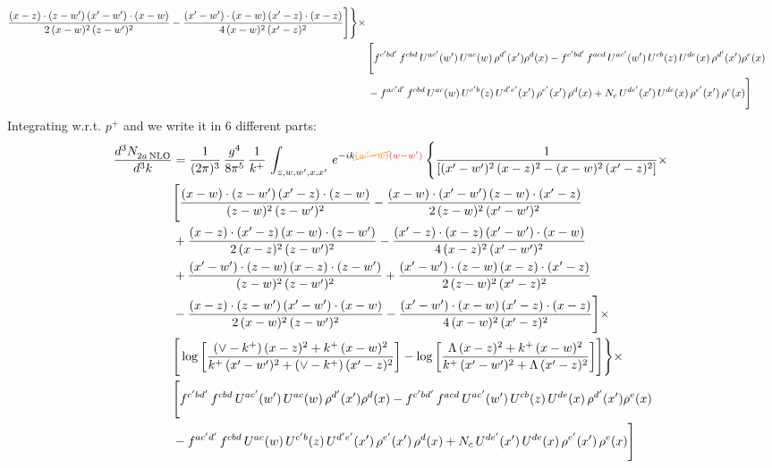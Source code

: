 \documentclass[9pt]{article}
\numberwithin{equation}{section}
\begin{document}
\begin{align}
\frac{(x-z)\cdot (z-w')\, (x'-w')\cdot (x-w)}{2\, (x-w)^{2}\, (z-w')^{2}} -\frac{(x'-w')\cdot (x-w)\, (x'-z)\cdot (x-z)}{4\, (x-w)^{2}\, (x'-z)^{2}}\Bigg] \Bigg\} \times\, \notag \\ & \Bigg[f^{c'bd'}\,f^{cbd}\, U^{ac'}(w')\,U^{ac}(w)\,\rho^{d'}(x')\rho^{d}(x)- f^{c'bd'}\,f^{acd}\,U^{ac'}(w')\,U^{cb}(z)\,U^{de}(x)\,\rho^{d'}(x')\rho^{e}(x) \notag \\ & -f^{ac'd'}\,f^{cbd}\,U^{ac}(w)\,U^{c'b}(z)\,U^{d'e'}(x')\,\rho^{e'}(x')\,\rho^{d}(x) +N_{c}\,U^{de'}(x')\,U^{de}(x)\,\rho^{e'}(x')\,\rho^{e}(x)\Bigg]
\end{align}
Integrating w.r.t. $p^{+}$ and we write it in 6 different parts:
\begin{align} 
    \frac{d^{3}N_{2a\,\rm NLO}^{\rm}}{d^{3}k}  & = \frac{1}{(2\pi)^{3}}\, \frac{g^{4}}{8\pi^{5}}\,\frac{1}{k^{+}}\,\int_{z,w,w^{\prime},x,x'}\, e^{-ik{\color{orange}\cancel{(w^{\prime}-w)}}{\color{red}(w-w^{\prime})}}\, \Bigg\{\frac{1}{\left[(x'-w')^{2}\, (x-z)^{2}-(x-w)^{2}\, (x'-z)^{2}\right]}\times\,\notag \\ & \Bigg[\frac{(x-w)\cdot (z-w')\, (x'-z)\cdot (z-w)}{(z-w)^{2}\,(z-w')^{2}}-\frac{(x-w)\cdot (x'-w')\, (z-w)\cdot (x'-z)}{2\, (z-w)^{2}\, (x'-w')^{2}}\notag \\ & + \frac{(x-z)\cdot (x'-z)\, (x-w)\cdot (z-w')}{2\, (x-z)^{2}\, (z-w')^{2}}-\frac{(x'-z)\cdot (x-z)\, (x'-w')\cdot (x-w)}{4\, (x-z)^{2}\, (x'-w')^{2}}\notag \\ & + \frac{(x'-w')\cdot (z-w)\, (x-z)\cdot (z-w')}{(z-w)^{2}\,(z-w')^{2}}+\frac{(x'-w')\cdot (z-w)\, (x-z)\cdot (x'-z)}{2\, (z-w)^{2}\, (x'-z)^{2}}\notag \\ & - \frac{(x-z)\cdot (z-w')\, (x'-w')\cdot (x-w)}{2\, (x-w)^{2}\, (z-w')^{2}} -\frac{(x'-w')\cdot (x-w)\, (x'-z)\cdot (x-z)}{4\, (x-w)^{2}\, (x'-z)^{2}}\Bigg]\times\notag \\ &  \Bigg[\log{\left[\frac{(\vee-k^{+})\,(x-z)^{2}+k^{+}\,(x-w)^{2}}{k^{+}\, (x'-w')^{2} + (\vee-k^{+})\, (x'-z)^{2}}\right]}-\log{\left[\frac{\Lambda\,(x-z)^{2}+k^{+}\,(x-w)^{2}}{k^{+}\, (x'-w')^{2} + \Lambda\, (x'-z)^{2}}\right]}\Bigg] \Bigg\} \times\, \notag \\ & \Bigg[f^{c'bd'}\,f^{cbd}\, U^{ac'}(w')\,U^{ac}(w)\,\rho^{d'}(x')\rho^{d}(x)- f^{c'bd'}\,f^{acd}\,U^{ac'}(w')\,U^{cb}(z)\,U^{de}(x)\,\rho^{d'}(x')\rho^{e}(x) \notag \\ & -f^{ac'd'}\,f^{cbd}\,U^{ac}(w)\,U^{c'b}(z)\,U^{d'e'}(x')\,\rho^{e'}(x')\,\rho^{d}(x) +N_{c}\,U^{de'}(x')\,U^{de}(x)\,\rho^{e'}(x')\,\rho^{e}(x)\Bigg]
\end{align}
\end{document}
